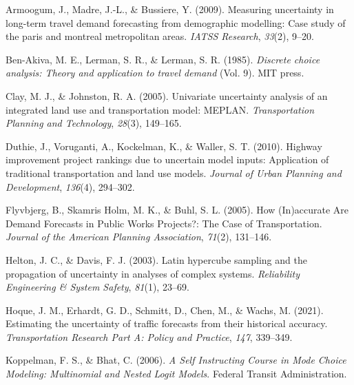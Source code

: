 \documentclass[fancy, masters, twoside]{byuthesis}
\newlength{\cslhangindent}
\newlength{\cslentryspacingunit} %
\newenvironment{CSLReferences}[2] %
 {%
  \setlength{\parindent}{0pt}
  \ifodd #1
  \let\oldpar\par
  \def\par{\hangindent=\cslhangindent\oldpar}
  \fi
  \setlength{\parskip}{#2\cslentryspacingunit}
 }%
 {}
\begin{document}
\pagestyle{myrefs}

\hypertarget{refs}{}
\begin{CSLReferences}{1}{0}
\leavevmode{}%
Armoogum, J., Madre, J.-L., \& Bussiere, Y. (2009). Measuring uncertainty in long-term travel demand forecasting from demographic modelling: Case study of the paris and montreal metropolitan areas. \emph{IATSS Research}, \emph{33}(2), 9--20.

\leavevmode{}%
Ben-Akiva, M. E., Lerman, S. R., \& Lerman, S. R. (1985). \emph{Discrete choice analysis: Theory and application to travel demand} (Vol. 9). MIT press.

\leavevmode{}%
Clay, M. J., \& Johnston, R. A. (2005). Univariate uncertainty analysis of an integrated land use and transportation model: MEPLAN. \emph{Transportation Planning and Technology}, \emph{28}(3), 149--165.

\leavevmode{}%
Duthie, J., Voruganti, A., Kockelman, K., \& Waller, S. T. (2010). Highway improvement project rankings due to uncertain model inputs: Application of traditional transportation and land use models. \emph{Journal of Urban Planning and Development}, \emph{136}(4), 294--302.

\leavevmode{}%
Flyvbjerg, B., Skamris Holm, M. K., \& Buhl, S. L. (2005). How ({In})accurate {Are Demand Forecasts} in {Public Works Projects}?: {The Case} of {Transportation}. \emph{Journal of the American Planning Association}, \emph{71}(2), 131--146.

\leavevmode{}%
Helton, J. C., \& Davis, F. J. (2003). Latin hypercube sampling and the propagation of uncertainty in analyses of complex systems. \emph{Reliability Engineering \& System Safety}, \emph{81}(1), 23--69.

\leavevmode{}%
Hoque, J. M., Erhardt, G. D., Schmitt, D., Chen, M., \& Wachs, M. (2021). Estimating the uncertainty of traffic forecasts from their historical accuracy. \emph{Transportation Research Part A: Policy and Practice}, \emph{147}, 339--349.

\leavevmode{}%
Koppelman, F. S., \& Bhat, C. (2006). \emph{A {Self Instructing Course} in {Mode Choice Modeling}: {Multinomial} and {Nested Logit Models}}. {Federal Transit Administration}.


\end{CSLReferences}
\end{document}
